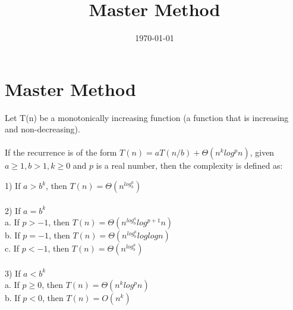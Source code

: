 \documentclass[a4paper, 12pt]{article}
\begin{document}
\title{Master Method}
\date{\today}
\pagestyle{empty} 
\section*{Master Method}
Let T(n) be a monotonically increasing function (a function that is increasing and non-decreasing).\\
	\\
	If the recurrence is of the form $T(n) = aT(n/b) + \Theta(n^k log^p n)$, given $a \geq 1, b > 1, k \geq 0$ and $p$ is a real number, then the complexity is defined as:\\
	
\begin{tabbing}
1) If $a > b^k$, then $T(n) = \Theta(n^{log_b^a})$ \\
\\
2) If $a = b^k$ \=\\
\> a. If $p > -1$, then $T(n) = \Theta(n^{log_b^a} log^{p+1} n)$	\\
\> b. If $p = -1$, then $T(n) = \Theta(n^{log_b^a} log log n)$ \\
\> c. If $p < -1$, then $T(n) = \Theta(n^{log_b^a})$\\
\\
3) If $a < b^k$ \\
\> a. If $p \geq 0$, then $T(n) = \Theta(n^k log^p n)$\\
\> b. If $p < 0$, then $T(n) = O(n^k)$ \\
\end{tabbing}
\end{document}
